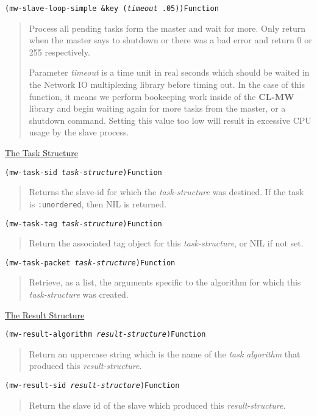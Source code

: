 \documentclass[titlepage,12pt]{book}
\newcommand{\xsmall}{\latexhtml{\small}{}}
\newcommand{\xnormalsize}{\latexhtml{\normalsize}{}}
\newcommand{\clmw}{\xsmall\textbf{CL-MW}\xnormalsize\xspace}
\newcommand{\ta}{\textit{task algorithm}\xspace}
\newcommand{\un}{\texttt{:unordered}\xspace}
\newcommand{\apiheader}[1]{\begin{center}\underline{#1}\end{center}}
\newcommand{\apifunc}[2]{\noindent\xsmall\texttt{(#1)}\hspace*{\fill}\xnormalsize\texttt{#2}}
\newenvironment{apientry}[2]
	{\apifunc{#1}{#2}\begin{quotation}}
	{\end{quotation}}
\begin{document}
\begin{apientry}
{mw-slave-loop-simple \&key (\emph{timeout} .05)}
{Function}
Process all pending tasks form the master and wait for more. Only
return when the master says to shutdown or there was a bad error and
return 0 or 255 respectively.

Parameter \emph{timeout} is a time unit in real seconds which should
be waited in the Network IO multiplexing library before timing out.
In the case of this function, it means we perform bookeeping work
inside of the \clmw library and begin waiting again for more tasks
from the master, or a shutdown command. Setting this value too low
will result in excessive CPU usage by the slave process.
\end{apientry}

\apiheader{The Task Structure}
\begin{apientry}
{mw-task-sid \emph{task-structure}}
{Function}
Returns the slave-id for which the \emph{task-structure} was destined. 
If the task is \un, then NIL is returned.
\end{apientry}

\begin{apientry}
{mw-task-tag \emph{task-structure}}
{Function}
Return the associated tag object for this \emph{task-structure}, or NIL 
if not set.
\end{apientry}

\begin{apientry}
{mw-task-packet \emph{task-structure}}
{Function}
Retrieve, as a list, the arguments specific to the algorithm for
which this \emph{task-structure} was created.
\end{apientry}

\apiheader{The Result Structure}
\begin{apientry}
{mw-result-algorithm \emph{result-structure}}
{Function}
Return an uppercase string which is the name of the \ta that produced this
\emph{result-structure}.
\end{apientry}

\begin{apientry}
{mw-result-sid \emph{result-structure}}
{Function}
Return the slave id of the slave which produced this \emph{result-structure}.
\end{apientry}
\end{document}
